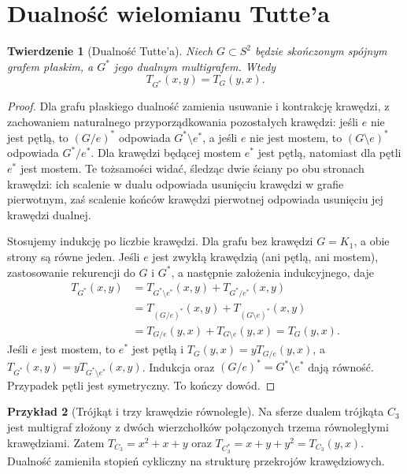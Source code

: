\documentclass[11pt,a4paper]{report}
\numberwithin{equation}{section}
\theoremstyle{plain}
\newtheorem{twierdzenie}{Twierdzenie}[section]
\theoremstyle{definition}
\newtheorem{przyklad}[twierdzenie]{Przykład}
\theoremstyle{remark}
\begin{document}
\section{Dualność wielomianu Tutte'a}
\label{sec:tg-tutte-duality}

\begin{twierdzenie}[Dualność Tutte'a]
\label{thm:tg-tutte-dual}
Niech $G\subset S^2$ będzie skończonym spójnym grafem
płaskim, a $G^*$ jego dualnym multigrafem. Wtedy
\[
 T_{G^*}(x,y)=T_G(y,x).
\]
\end{twierdzenie}

\begin{proof}
Dla grafu płaskiego dualność zamienia usuwanie i kontrakcję
krawędzi, z zachowaniem naturalnego przyporządkowania
pozostałych krawędzi: jeśli $e$ nie jest pętlą, to
$(G/e)^*$ odpowiada $G^*\setminus e^*$, a jeśli $e$
nie jest mostem, to $(G\setminus e)^*$ odpowiada
$G^*/e^*$. Dla krawędzi będącej mostem $e^*$ jest
pętlą, natomiast dla pętli $e^*$ jest mostem.
Te tożsamości widać, śledząc dwie ściany po obu
stronach krawędzi: ich scalenie w dualu odpowiada
usunięciu krawędzi w grafie pierwotnym, zaś
scalenie końców krawędzi pierwotnej odpowiada
usunięciu jej krawędzi dualnej.

Stosujemy indukcję po liczbie krawędzi. Dla grafu
bez krawędzi $G=K_1$, a obie strony są równe jeden.
Jeśli $e$ jest zwykłą krawędzią (ani pętlą,
ani mostem), zastosowanie rekurencji do $G$ i $G^*$,
a następnie założenia indukcyjnego, daje
\[
\begin{aligned}
T_{G^*}(x,y)
 &=T_{G^*\setminus e^*}(x,y)+T_{G^*/e^*}(x,y)\\
 &=T_{(G/e)^*}(x,y)+T_{(G\setminus e)^*}(x,y)\\
 &=T_{G/e}(y,x)+T_{G\setminus e}(y,x)=T_G(y,x).
\end{aligned}
\]
Jeśli $e$ jest mostem, to $e^*$ jest pętlą i
$T_G(y,x)=yT_{G/e}(y,x)$, a
$T_{G^*}(x,y)=yT_{G^*\setminus e^*}(x,y)$.
Indukcja oraz $(G/e)^*=G^*\setminus e^*$ dają równość.
Przypadek pętli jest symetryczny. To kończy dowód.
\end{proof}

\begin{przyklad}[Trójkąt i trzy krawędzie równoległe]
Na sferze dualem trójkąta $C_3$ jest multigraf złożony
z dwóch wierzchołków połączonych trzema równoległymi
krawędziami. Zatem
$T_{C_3}=x^2+x+y$ oraz
$T_{C_3^*}=x+y+y^2=T_{C_3}(y,x)$.
Dualność zamieniła stopień cykliczny na strukturę
przekrojów krawędziowych.
\end{przyklad}
\end{document}
